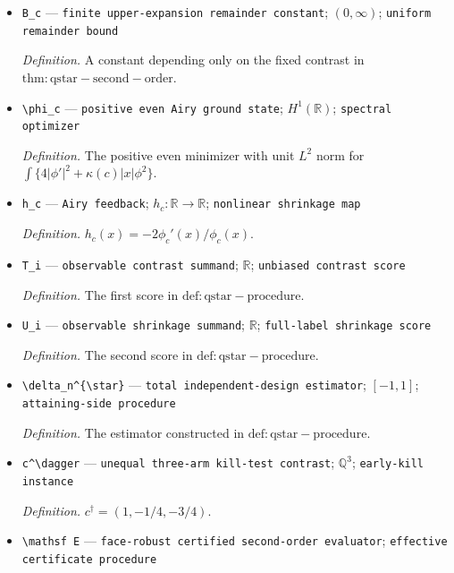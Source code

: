\documentclass{article}
\begin{document}
\begin{itemize}
  \par\smallskip\noindent\emph{Definition.} \(\Lambda_c=C_A\kappa(c)^{2/3}\).
  \item \texttt{B\_\allowbreak{}c} --- \texttt{finite upper-\allowbreak{}expansion remainder constant}; \((0,\infty)\); \texttt{uniform remainder bound}
  \par\smallskip\noindent\emph{Definition.} A constant depending only on the fixed contrast in \(\mathrm{thm:qstar-second-order}\).
  \item \texttt{\textbackslash{}\allowbreak{}phi\_\allowbreak{}c} --- \texttt{positive even Airy ground state}; \(H^1(\mathbb R)\); \texttt{spectral optimizer}
  \par\smallskip\noindent\emph{Definition.} The positive even minimizer with unit \(L^2\) norm for \(\int\{4|\phi'|^2+\kappa(c)|x|\phi^2\}\).
  \item \texttt{h\_\allowbreak{}c} --- \texttt{Airy feedback}; \(h_c:\mathbb R\to\mathbb R\); \texttt{nonlinear shrinkage map}
  \par\smallskip\noindent\emph{Definition.} \(h_c(x)=-2\phi_c'(x)/\phi_c(x)\).
  \item \texttt{T\_\allowbreak{}i} --- \texttt{observable contrast summand}; \(\mathbb R\); \texttt{unbiased contrast score}
  \par\smallskip\noindent\emph{Definition.} The first score in \(\mathrm{def:qstar-procedure}\).
  \item \texttt{U\_\allowbreak{}i} --- \texttt{observable shrinkage summand}; \(\mathbb R\); \texttt{full-\allowbreak{}label shrinkage score}
  \par\smallskip\noindent\emph{Definition.} The second score in \(\mathrm{def:qstar-procedure}\).
  \item \texttt{\textbackslash{}\allowbreak{}delta\_\allowbreak{}n\textasciicircum{}\{\textbackslash{}\allowbreak{}star\}\allowbreak{}} --- \texttt{total independent-\allowbreak{}design estimator}; \([-1,1]\); \texttt{attaining-\allowbreak{}side procedure}
  \par\smallskip\noindent\emph{Definition.} The estimator constructed in \(\mathrm{def:qstar-procedure}\).
  \item \texttt{c\textasciicircum{}\textbackslash{}\allowbreak{}dagger} --- \texttt{unequal three-\allowbreak{}arm kill-\allowbreak{}test contrast}; \(\mathbb Q^3\); \texttt{early-\allowbreak{}kill instance}
  \par\smallskip\noindent\emph{Definition.} \(c^\dagger=(1,-1/4,-3/4)\).
  \item \texttt{\textbackslash{}\allowbreak{}mathsf E} --- \texttt{face-\allowbreak{}robust certified second-\allowbreak{}order evaluator}; \texttt{effective certificate procedure}

\end{itemize}
\end{document}
